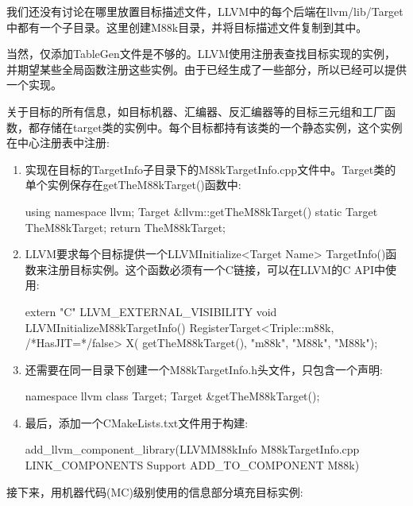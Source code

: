 我们还没有讨论在哪里放置目标描述文件，LLVM中的每个后端在llvm/lib/Target中都有一个子目录。这里创建M88k目录，并将目标描述文件复制到其中。

当然，仅添加TableGen文件是不够的。LLVM使用注册表查找目标实现的实例，并期望某些全局函数注册这些实例。由于已经生成了一些部分，所以已经可以提供一个实现。

关于目标的所有信息，如目标机器、汇编器、反汇编器等的目标三元组和工厂函数，都存储在target类的实例中。每个目标都持有该类的一个静态实例，这个实例在中心注册表中注册:

\begin{enumerate}
\item
实现在目标的TargetInfo子目录下的M88kTargetInfo.cpp文件中。Target类的单个实例保存在getTheM88kTarget()函数中:

\begin{cpp}
using namespace llvm;
Target &llvm::getTheM88kTarget() {
    static Target TheM88kTarget;
    return TheM88kTarget;
}
\end{cpp}

\item
LLVM要求每个目标提供一个LLVMInitialize<Target Name> TargetInfo()函数来注册目标实例。这个函数必须有一个C链接，可以在LLVM的C API中使用:

\begin{cpp}
extern "C" LLVM_EXTERNAL_VISIBILITY void
LLVMInitializeM88kTargetInfo() {
    RegisterTarget<Triple::m88k, /*HasJIT=*/false> X(
        getTheM88kTarget(), "m88k", "M88k", "M88k");
}
\end{cpp}

\item
还需要在同一目录下创建一个M88kTargetInfo.h头文件，只包含一个声明:

\begin{cpp}
namespace llvm {
class Target;
Target &getTheM88kTarget();
}
\end{cpp}

\item
最后，添加一个CMakeLists.txt文件用于构建:

\begin{cmake}
add_llvm_component_library(LLVMM88kInfo
    M88kTargetInfo.cpp
    LINK_COMPONENTS Support
    ADD_TO_COMPONENT M88k)
\end{cmake}

\end{enumerate}

接下来，用机器代码(MC)级别使用的信息部分填充目标实例:

